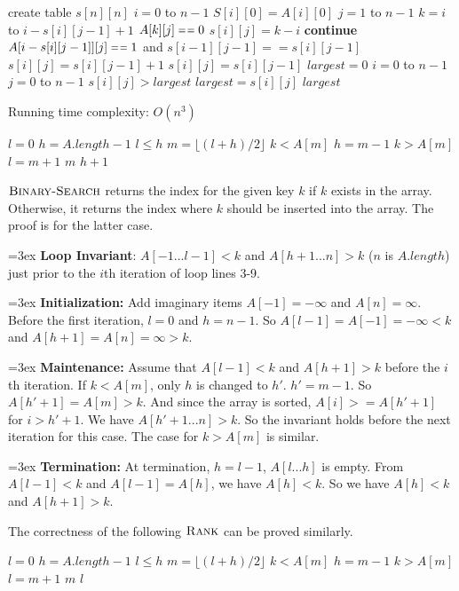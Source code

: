 \documentclass[12pt,twoside]{article}
\begin{document}
\begin{codebox}
\li create table $s[n][n]$
\li \For $i=0$ to $n-1$
\li \Do $S[i][0] = A[i][0]$
\li \For $j=1$ to $n-1$
\Do
\li \For $k=i$ to $i-s[i][j-1]+1$
\Do \li \If $A[k][j] \isequal 0$
\li \Then $s[i][j] = k - i$
\li \textbf{continue}
\End \End
\li \If $A[i-s[i][j-1]][j] \isequal 1$ and $s[i-1][j-1] == s[i][j-1]$
\li \Then $s[i][j] = s[i][j-1] + 1$
\li \Else $s[i][j] = s[i][j-1]$
\End \End \End
\li $largest = 0$
\li \For $i = 0$ to $n-1$
\Do \li \For $j = 0$ to $n-1$
\Do \li \If $s[i][j] > largest$
\li \Then $largest = s[i][j]$
\End \End \End
\li \Return $largest$
\end{codebox}
Running time complexity: $O(n^3)$


\begin{codebox}
\li $l = 0$
\li $h = A.length - 1$
\li \While $l \le h$
\li \Do $m = \lfloor(l + h) / 2\rfloor$
\li \If $k < A[m]$
\li \Then $h = m -1$
\li \ElseIf $k > A[m]$
\li \Then $l = m + 1$
\li \Else \Return $m$
\End \End
\li \Return $h+1$
\end{codebox}
$\textnormal{\scshape Binary-Search}$ returns the index for the given key $k$ if $k$ exists in
the array. Otherwise, it returns the index where $k$ should be inserted into the
array. The proof is for the latter case.

\noindent \hangindent=3ex \textbf{Loop Invariant}: $A[-1...l-1] < k$ and
$A[h+1...n] > k$ ($n$ is $A.length$) just prior to the $i$th iteration of loop
lines 3-9.

\noindent \hangindent=3ex \textbf{Initialization:} Add imaginary items $A[-1] =
-\infty$ and $A[n] = \infty$. Before the first iteration, $l = 0$ and $h = n-1$.
So $A[l-1] = A[-1] = -\infty < k$ and $A[h+1] = A[n] = \infty > k$.

\noindent \hangindent=3ex \textbf{Maintenance:} Assume that $A[l-1] < k$ and
$A[h+1] > k$ before the $i$th iteration. If $k < A[m]$, only $h$ is changed to
$h'$. $h' = m - 1$. So $A[h'+1] = A[m] > k$. And since the array is sorted,
$A[i] >= A[h'+1]$ for $i > h'+1$. We have $A[h'+1...n] > k$. So the invariant
holds before the next iteration for this case.  The case for $k > A[m]$ is
similar.

\noindent \hangindent=3ex \textbf{Termination:} At termination, $h = l -1$,
$A[l...h]$ is empty. From $A[l-1] < k$ and $A[l-1] = A[h]$, we have $A[h] < k$.
So we have $A[h] < k$ and $A[h+1] > k$.


The correctness of the following $\textnormal{\scshape Rank}$ can be proved similarly.
\begin{codebox}
\li $l = 0$
\li $h = A.length - 1$
\li \While $l \le h$
\li \Do $m = \lfloor(l + h) / 2\rfloor$
\li \If $k < A[m]$
\li \Then $h = m -1$
\li \ElseIf $k > A[m]$
\li \Then $l = m + 1$
\li \Else \Return $m$
\End \End
\li \Return $l$
\end{codebox}
\end{document}
